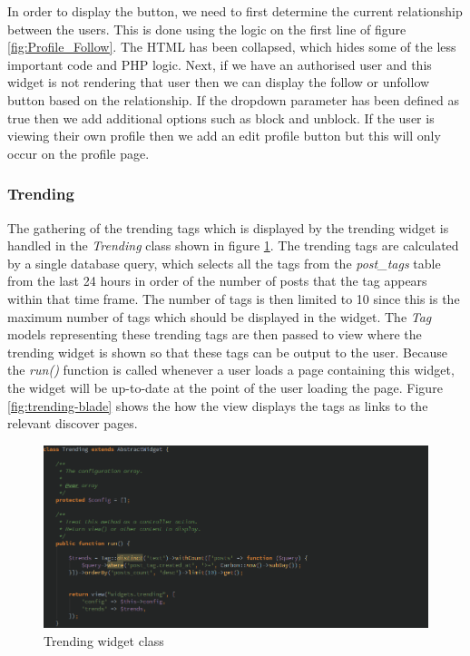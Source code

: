 In order to display the button, we need to first determine the current relationship between the users. This is done using the logic on the first line of figure \ref{fig:Profile_Follow}. The HTML has been collapsed, which hides some of the less important code and PHP logic. Next, if we have an authorised user and this widget is not rendering that user then we can display the follow or unfollow button based on the relationship. If the dropdown parameter has been defined as true then we add additional options such as block and unblock. If the user is viewing their own profile then we add an edit profile button but this will only occur on the profile page.

\subsubsection{Trending}
The gathering of the trending tags which is displayed by the trending widget is handled in the \emph{Trending} class shown in figure \ref{fig:trending-class}. The trending tags are calculated by a single database query, which selects all the tags from the \emph{post\_tags} table from the last 24 hours in order of the number of posts that the tag appears within that time frame. The number of tags is then limited to 10 since this is the maximum number of tags which should be displayed in the widget. The \emph{Tag} models representing these trending tags are then passed to view where the trending widget is shown so that these tags can be output to the user. Because the \textit{run()} function is called whenever a user loads a page containing this widget, the widget will be up-to-date at the point of the user loading the page. Figure \ref{fig:trending-blade} shows the how the view displays the tags as links to the relevant discover pages.

\begin{figure}[H]
    \centering
    \includegraphics[width=\textwidth]{Images/Implementation/UI/Widgets/trending-class}
    \caption{Trending widget class}
    \label{fig:trending-class}
\end{figure}

